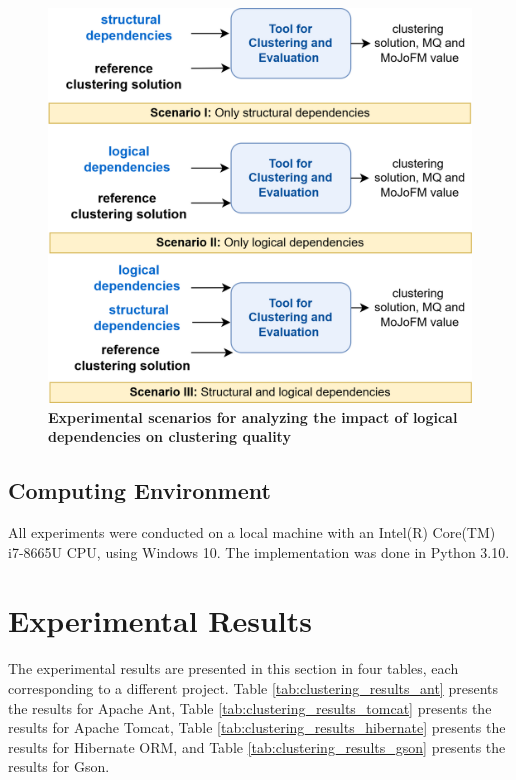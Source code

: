 \documentclass{ieeeaccess}
\begin{document}
\begin{figure}[t!]
  \centering
  \includegraphics[width=\columnwidth]{scenario.png}
  \caption{ \textbf{Experimental scenarios for analyzing the impact of logical dependencies on clustering quality}}
  \label{fig:scenatrio}
\end{figure}


\subsection{Computing Environment}

All experiments were conducted on a local machine with an Intel(R) Core(TM) i7-8665U CPU, using Windows 10. The implementation was done in Python 3.10.


\section{Experimental Results}
\label{sec:results}

The experimental results are presented in this section in four tables, each corresponding to a different project. Table \ref{tab:clustering_results_ant} presents the results for Apache Ant, Table \ref{tab:clustering_results_tomcat} presents the results for Apache Tomcat, Table \ref{tab:clustering_results_hibernate} presents the results for Hibernate ORM, and Table \ref{tab:clustering_results_gson} presents the results for Gson.
\end{document}
